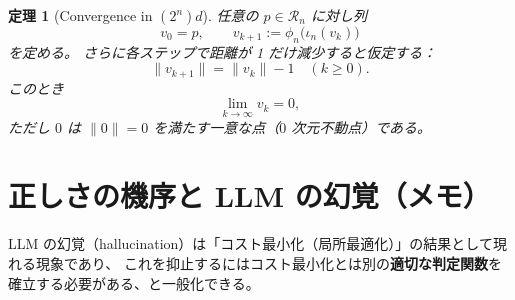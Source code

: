 \documentclass[12pt,a4paper]{article}
\newcommand{\dfix}{\mathfrak{0}}
\newcommand{\Rep}{\mathcal{R}}
\newtheorem{theorem}{定理}[section]
\begin{document}
\begin{theorem}[Convergence in $(2^{n})d$]
任意の $p\in\Rep_{n}$ に対し列
\[
  v_{0}=p,\qquad v_{k+1}:=\phi_{n}\bigl(\iota_{n}(v_{k})\bigr)
\]
を定める。
さらに各ステップで距離が 1 だけ減少すると仮定する：
\[
  \|v_{k+1}\|=\|v_{k}\|-1\quad(k\ge0).
\]
このとき
\[
  \lim_{k\to\infty}v_{k}=\dfix,
\]
ただし $\dfix$ は $\|\dfix\|=0$ を満たす一意な点（$0$ 次元不動点）である。
\end{theorem}

\section{正しさの機序と LLM の幻覚（メモ）}
LLM の幻覚（hallucination）は「コスト最小化（局所最適化）」の結果として現れる現象であり、
これを抑止するにはコスト最小化とは別の\textbf{適切な判定関数}を確立する必要がある、と一般化できる。
\end{document}
